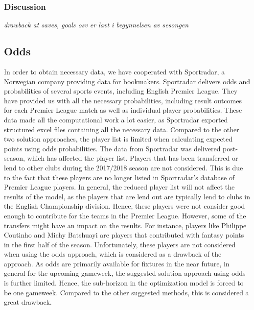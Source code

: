 \subsubsection{Discussion}
\textit{drawback at saves, goals osv er lavt i begynnelsen av sesongen}

\subsection{Odds}
In order to obtain necessary data, we have cooperated with Sportradar, a Norwegian company providing data for bookmakers. Sportradar delivers odds and probabilities of several sports events, including English Premier League. They have provided us with all the necessary probabilities, including result outcomes for each Premier League match as well as individual player probabilities. These data made all the computational work a lot easier, as Sportradar exported structured excel files containing all the necessary data. 
\newpar
Compared to the other two solution approaches, the player list is limited when calculating expected points using odds probabilities. The data from Sportradar was delivered post-season, which has affected the player list. Players that has been transferred or lend to other clubs during the 2017/2018 season are not considered. This is due to the fact that these players are no longer listed in Sportradar's database of Premier League players. In general, the reduced player list will not affect the results of the model, as the players that are lend out are typically lend to clubs in the English Championship division. Hence, these players were not consider good enough to contribute for the teams in the Premier League. However, some of the transfers might have an impact on the results. For instance, players like Philippe Coutinho and Michy Batshuayi are players that contributed with fantasy points in the first half of the season. Unfortunately, these players are not considered when using the odds approach, which is considered as a drawback of the approach.  
\newpar
As odds are primarily available for fixtures in the near future, in general for the upcoming gameweek, the suggested solution approach using odds is further limited. Hence, the sub-horizon in the optimization model is forced to be one gameweek. Compared to the other suggested methods, this is considered a great drawback.

